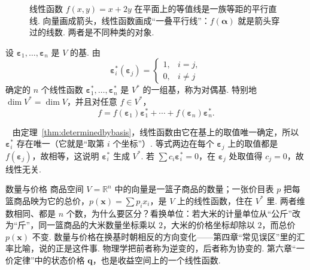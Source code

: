 \documentclass[lang=cn,10.5pt,scheme=chinese,toc=twocol,section,chinesefont=nofont,
twoside,citestyle=gb7714-2015,bibstyle=gb7714-2015]{elegantbook}
\DeclareRobustCommand{\textbf}[1]{{\lnsemiboldlatin\lnsemiboldcjk #1}}
\newcommand{\vv}[1]{\boldsymbol{#1}}
\numberwithin{equation}{section}   %
\newcommand*{\lnlabel}[1]{{\sffamily\bfseries\color{black}#1}}
\renewenvironment{proof}{%
	\par\noindent\lnlabel{\proofname}\;\ \color{black!90}\cfs}{\par}
\begin{document}
\begin{figure}[htbp]
  \centering
  \caption{线性函数 $f(x,y)=x+2y$ 在平面上的等值线是一族等距的平行直线. 向量画成箭头，线性函数画成“一叠平行线”：$f(\vv\alpha)$ 就是箭头穿过的线数. 两者是不同种类的对象.}
  \label{fig:covector}
\end{figure}

\begin{theorem}[对偶基]\label{thm:dualbasis}
  设 $\vv\varepsilon_1,\ldots,\vv\varepsilon_n$ 是 $V$ 的基. 由
  \[\vv\varepsilon_i^*(\vv\varepsilon_j)=
    \begin{cases}
      1, & i=j, \\0,&i\ne j
    \end{cases}
  \]
  确定的 $n$ 个线性函数 $\vv\varepsilon_1^*,\ldots,\vv\varepsilon_n^*$ 是 $V^*$ 的一组基，称为\textbf{对偶基}. 特别地 $\dim V^*=\dim V$，并且对任意 $f\in V^*$，
  \[f=f(\vv\varepsilon_1)\vv\varepsilon_1^*+\cdots+f(\vv\varepsilon_n)\vv\varepsilon_n^*.\]
\end{theorem}
\begin{proof}
  由定理~\ref{thm:determinedbybasis}，线性函数由它在基上的取值唯一确定，所以 $\vv\varepsilon_i^*$ 存在唯一（它就是“取第 $i$ 个坐标”）. 等式两边在每个 $\vv\varepsilon_j$ 上的取值都是 $f(\vv\varepsilon_j)$，故相等，这说明 $\vv\varepsilon_i^*$ 生成 $V^*$. 若 $\sum c_i\vv\varepsilon_i^*=0$，在 $\vv\varepsilon_j$ 处取值得 $c_j=0$，故线性无关.
\end{proof}

\begin{linkbox}{数量与价格}
  商品空间 $V=\mathbb{R}^n$ 中的向量是一篮子商品的\textbf{数量}；一张价目表 $p$ 把每篮商品映为它的总价，$p(\vv x)=\sum p_ix_i$，是 $V$ 上的线性函数，住在 $V^*$ 里. 两者维数相同、都是 $n$ 个数，为什么要区分？看换单位：若大米的计量单位从“公斤”改为“斤”，同一篮商品的大米\textbf{数量}坐标乘以 $2$，大米的\textbf{价格}坐标却除以 $2$，而总价 $p(\vv x)$ 不变. 数量与价格在换基时朝\textbf{相反}的方向变化——第四章“常见误区”里的汇率比喻，说的正是这件事. 物理学把前者称为\textbf{逆变}的，后者称为\textbf{协变}的. 第六章“一价定律”中的状态价格 $\vv q$，也是收益空间上的一个线性函数.
\end{linkbox}
\end{document}
